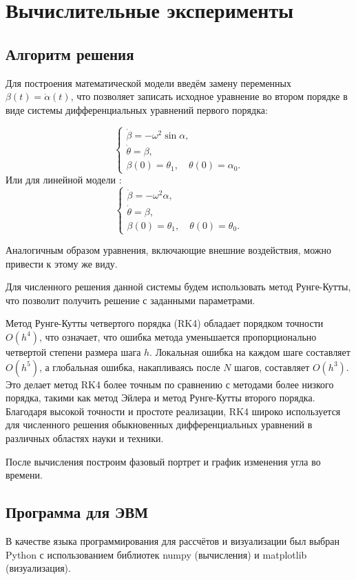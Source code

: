 \chapter{Вычислительные эксперименты}
\section{Алгоритм решения}
Для построения математической модели введём замену переменных $\beta(t) = \dot{\alpha}(t)$, что позволяет записать исходное уравнение во втором порядке в виде системы дифференциальных уравнений первого порядка:

\[
\begin{cases}
	\dot{\beta} = -\omega^2 \sin \alpha, \\
	\dot{\theta} = \beta, \\
	\beta(0) = \theta_1, \quad \theta(0) = \alpha_0.
\end{cases}
\]
Или для линейной модели :
\[
\begin{cases}
	\dot{\beta} = -\omega^2 \alpha, \\
	\dot{\theta} = \beta, \\
	\beta(0) = \theta_1, \quad \theta(0) = \theta_0.
\end{cases}
\]

Аналогичным образом уравнения, включающие внешние воздействия, можно привести к этому же виду.

Для численного решения данной системы будем использовать метод Рунге-Кутты\cite{1964calculus}, что позволит получить решение с заданными параметрами. 

Метод Рунге-Кутты четвертого порядка (RK4) обладает порядком точности \( O(h^4) \), что означает, что ошибка метода уменьшается пропорционально четвертой степени размера шага \( h \). Локальная ошибка на каждом шаге составляет \( O(h^5) \), а глобальная ошибка, накапливаясь после \( N \) шагов, составляет \( O(h^3) \). Это делает метод RK4 более точным по сравнению с методами более низкого порядка, такими как метод Эйлера и метод Рунге-Кутты второго порядка. Благодаря высокой точности и простоте реализации, RK4 широко используется для численного решения обыкновенных дифференциальных уравнений в различных областях науки и техники.


После вычисления построим фазовый портрет и график изменения угла во времени.

\section{Программа для ЭВМ}
В качестве языка программирования для рассчётов и визуализации был выбран Python с использованием библиотек numpy (вычисления) и matplotlib (визуализация).

